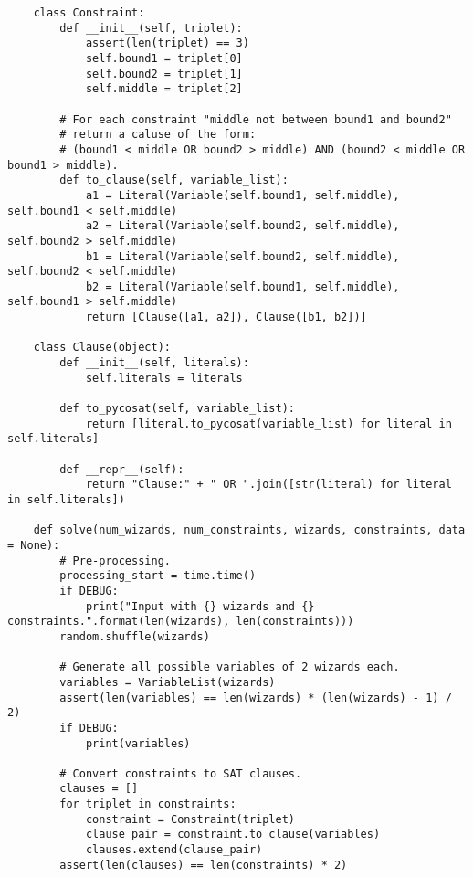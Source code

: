 \documentclass{article}
\theoremstyle{plain}
\numberwithin{theorem}{subsection}
\theoremstyle{definition}
\numberwithin{equation}{subsection}
\begin{document}
\begin{lstlisting}
    class Constraint:
        def __init__(self, triplet):
            assert(len(triplet) == 3)
            self.bound1 = triplet[0]
            self.bound2 = triplet[1]
            self.middle = triplet[2]
        
        # For each constraint "middle not between bound1 and bound2"
        # return a caluse of the form:
        # (bound1 < middle OR bound2 > middle) AND (bound2 < middle OR bound1 > middle).
        def to_clause(self, variable_list):
            a1 = Literal(Variable(self.bound1, self.middle), self.bound1 < self.middle)
            a2 = Literal(Variable(self.bound2, self.middle), self.bound2 > self.middle)
            b1 = Literal(Variable(self.bound2, self.middle), self.bound2 < self.middle)
            b2 = Literal(Variable(self.bound1, self.middle), self.bound1 > self.middle)
            return [Clause([a1, a2]), Clause([b1, b2])]
    
    class Clause(object):
        def __init__(self, literals):
            self.literals = literals
        
        def to_pycosat(self, variable_list):
            return [literal.to_pycosat(variable_list) for literal in self.literals]
    
        def __repr__(self):
            return "Clause:" + " OR ".join([str(literal) for literal in self.literals])
    
    def solve(num_wizards, num_constraints, wizards, constraints, data = None):
        # Pre-processing.
        processing_start = time.time()
        if DEBUG:
            print("Input with {} wizards and {} constraints.".format(len(wizards), len(constraints)))
        random.shuffle(wizards)
    
        # Generate all possible variables of 2 wizards each.
        variables = VariableList(wizards)
        assert(len(variables) == len(wizards) * (len(wizards) - 1) / 2)
        if DEBUG:
            print(variables)
    
        # Convert constraints to SAT clauses.
        clauses = []
        for triplet in constraints:
            constraint = Constraint(triplet)
            clause_pair = constraint.to_clause(variables)
            clauses.extend(clause_pair)
        assert(len(clauses) == len(constraints) * 2)
    

\end{lstlisting}
\end{document}
